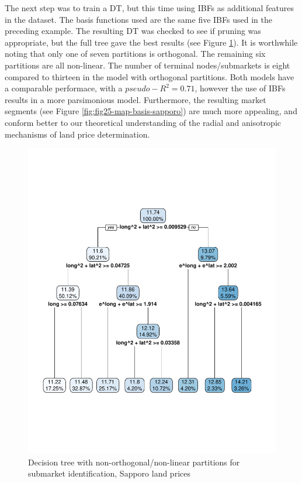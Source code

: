 \documentclass[]{elsarticle} %
\makeatletter
\def\maxwidth{\ifdim\Gin@nat@width>\linewidth\linewidth
\else\Gin@nat@width\fi}
\let\Oldincludegraphics\includegraphics
\renewcommand{\includegraphics}[1]{\Oldincludegraphics[width=\maxwidth]{#1}}
\makeatother
\begin{document}
The next step was to train a DT, but this time using IBFs as additional
features in the dataset. The basis functions used are the same five IBFs
used in the preceding example. The resulting DT was checked to see if
pruning was appropriate, but the full tree gave the best results (see
Figure \ref{fig:fig24-tree-basis-sapporo}). It is worthwhile noting that
only one of seven partitions is orthogonal. The remaining six partitions
are all non-linear. The number of terminal nodes/submarkets is eight
compared to thirteen in the model with orthogonal partitions. Both
models have a comparable performace, with a \(pseudo-R^2=0.71\), however
the use of IBFs results in a more parsimonious model. Furthermore, the
resulting market segments (see Figure \ref{fig:fig25-map-basis-sapporo})
are much more appealing, and conform better to our theoretical
understanding of the radial and anisotropic mechanisms of land price
determination.

\begin{figure}[htbp]
\centering
\includegraphics{Trees_with_Base_Functions_v2_files/figure-latex/fig24-tree-basis-sapporo-1.pdf}
\caption{\label{fig:fig24-tree-basis-sapporo}Decision tree with
non-orthogonal/non-linear partitions for submarket identification,
Sapporo land prices}
\end{figure}
\end{document}
